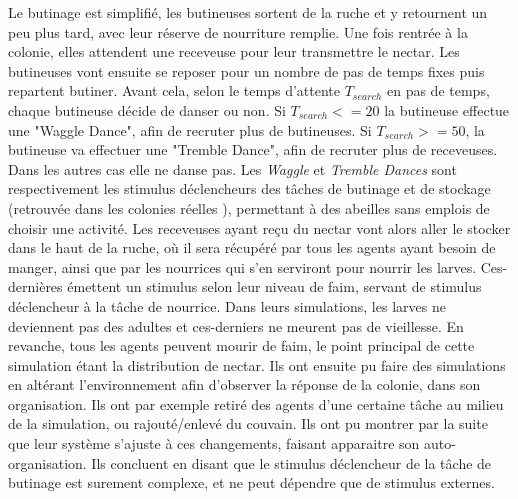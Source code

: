         Le butinage est simplifié, les butineuses sortent de la ruche et y retournent un peu plus tard, avec leur réserve de nourriture remplie. Une fois rentrée à la colonie, elles attendent une receveuse pour leur transmettre le nectar. Les butineuses vont ensuite se reposer pour un nombre de pas de temps fixes puis repartent butiner. Avant cela, selon le temps d'attente $T_{search}$ en pas de temps, chaque butineuse décide de danser ou non. Si $T_{search} <= 20$ la butineuse effectue une "Waggle Dance", afin de recruter plus de butineuses. Si $T_{search} >= 50$, la butineuse va effectuer une "Tremble Dance", afin de recruter plus de receveuses. Dans les autres cas elle ne danse pas. Les \textit{Waggle} et \textit{Tremble Dances} sont respectivement les stimulus déclencheurs des tâches de butinage et de stockage (retrouvée dans les colonies réelles \cite{winston_biology_1991}), permettant à des abeilles sans emplois de choisir une activité. 
        Les receveuses ayant reçu du nectar vont alors aller le stocker dans le haut de la ruche, où il sera récupéré par tous les agents ayant besoin de manger, ainsi que par les nourrices qui s'en serviront pour nourrir les larves. Ces-dernières émettent un stimulus selon leur niveau de faim, servant de stimulus déclencheur à la tâche de nourrice. Dans leurs simulations, les larves ne deviennent pas des adultes et ces-derniers ne meurent pas de vieillesse. En revanche, tous les agents peuvent mourir de faim, le point principal de cette simulation étant la distribution de nectar. Ils ont ensuite pu faire des simulations en altérant l'environnement afin d'observer la réponse de la colonie, dans son organisation. Ils ont par exemple retiré des agents d'une certaine tâche au milieu de la simulation, ou rajouté/enlevé du couvain. Ils ont pu montrer par la suite que leur système s'ajuste à ces changements, faisant apparaitre son auto-organisation. Ils concluent en disant que le stimulus déclencheur de la tâche de butinage est surement complexe, et ne peut dépendre que de stimulus externes.
        
